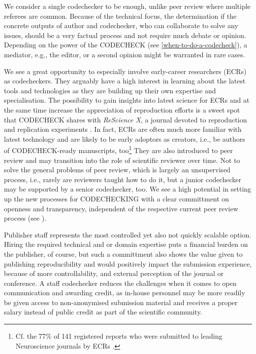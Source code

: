 \documentclass[12pt]{article}
\begin{document}
We consider a single codechecker to be enough, unlike peer review where
multiple referees are common. Because of the technical focus, the 
determination if the concrete outputs of author and codechecker, who can
collaborate to solve any issues, should be a very factual process and not
require much debate or opinion. Depending on the power of the CODECHECK
(see \ref{when-to-do-a-codecheck}), a mediator, e.g., the editor, or a
second opinion might be warranted in rare cases.

We see a great opportunity to especially involve early-career researchers
(ECRs) as codecheckers. They arguably have a high interest in learning
about the latest tools and technologies as they are building up their own
expertise and specialisation. The possibility to gain insights into latest
science for ECRs and at the same time increase the appreciation of
reproduction efforts is a sweet spot that CODECHECK shares
with \emph{ReScience X}, a journal devoted to reproduction and replication 
experiments \cite{roesch_new_2020}.
In fact, ECRs are often much more familiar with latest technology and are 
likely to be early adoptors as creators, i.e., be authors of CODECHECK-ready manuscripts, too\footnote{Cf. the 77\% of 141 registered reports who were 
submitted to leading Neuroscience journals by ECRs
\cite{chambers_registered_2019}.}
They are also introduced to peer review and 
may transition into the role of scientific reviewer over time.
Not to solve the general problems of peer review, which is largely an
unsupervised process, i.e., rarely are reviewers taught how to do it, but
a junior codechecker may be supported by a senior codechecker, too.
We see a high potential in setting up the new processes for CODECHECKING with
a clear committment on openness and transparency, independent of the
respective current peer review process (see ).

Publisher staff represents the most controlled yet also not quickly scalable
option. Hiring the required technical and or domain expertise puts a financial
burden on the publisher, of course, but such a committment also shows the 
value given to publishing reproducibility and would positively impact the 
submission experience, because of more controllability, and external 
perception of the journal or conference. A staff codechecker reduces the 
challenges when it comes to open communication and awarding credit, as
in-house personnel may be more readily be given access to non-anonymised
submission material and receives a proper salary instead of public credit
as part of the scientific community.
\end{document}
